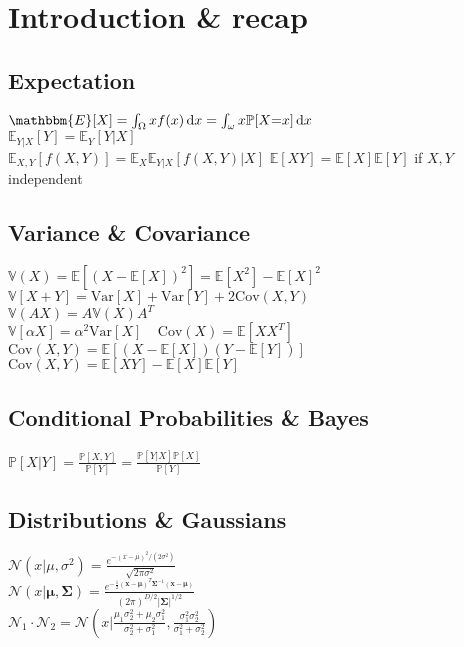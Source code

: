\section*{Introduction \& recap}
\subsection*{Expectation}
$\mathbbm{E}[X]=\int_{\Omega}xf(x)\di x=\int_{\omega}x\mathbb{P}[X{=}x]\di x$ \\
$\mathbb{E}_{Y|X}[Y]=\mathbb{E}_{Y}[Y|X]$\\
$\mathbb{E}_{X,Y}[f(X,Y)]=\mathbb{E}_{X}\mathbb{E}_{Y|X}[f(X,Y)|X]$
$\mathbb{E}[XY]=\mathbb{E}[X]\mathbb{E}[Y]$ if $X,Y$ independent

\subsection*{Variance \& Covariance}
$\mathbb{V}(X){=}\mathbb{E}[(X{-}\mathbb{E}[X])^2]{=}\mathbb{E}[X^2]{-}\mathbb{E}[X]^2$\\
$\mathbb{V}[X{+}Y]{=}\mathrm{Var}[X]{+}\mathrm{Var}[Y]{+}2\mathrm{Cov}(X,Y)$ \\
$\mathbb{V}(AX) = A \mathbb{V}(X) A^T$ \\
$\mathbb{V}[\alpha X]=\alpha^2\mathrm{Var}[X]\ \ \ \ \  \mathrm{Cov}(X)=\mathbb{E}[XX^T]$ \\
$\mathrm{Cov}(X,Y)=\mathbb{E}[(X-\mathbb{E}[X])(Y-\mathbb{E}[Y])]$
$\mathrm{Cov}(X,Y)=\mathbb{E}[XY]-\mathbb{E}[X]\mathbb{E}[Y]$

\subsection*{Conditional Probabilities \& Bayes}
$\mathbb{P}[X|Y]=\frac{\mathbb{P}[X,Y]}{\mathbb{P}[Y]}=\frac{\mathbb{P}[Y|X]\mathbb{P}[X]}{\mathbb{P}[Y]}$

\subsection*{Distributions \& Gaussians}
$\mathcal{N}(x|\mu, \sigma^2)=\frac{e^{-(x-\mu)^2/(2\sigma^2)}}{\sqrt{2\pi\sigma^2}}$\\
$\mathcal{N}(x|\bm{\mu}, \bm{\Sigma})= \frac{e^{-\frac{1}{2}(\mathbf{x}-\bm{\mu})^T\bm{\Sigma}^{-1}(\mathbf{x}-\bm{\mu})}}{(2\pi)^{D/2}|\bm{\Sigma}|^{1/2}} $\\
$\mathcal{N}_1\cdot\mathcal{N}_2=\mathcal{N}(x|\frac{\mu_1 \sigma_2^2 + \mu_2 \sigma_1^2}{\sigma_2^2 + \sigma_1^2}, \frac{\sigma_1^2 \sigma_2^2}{\sigma_1^2 + \sigma_2^2})$\\

